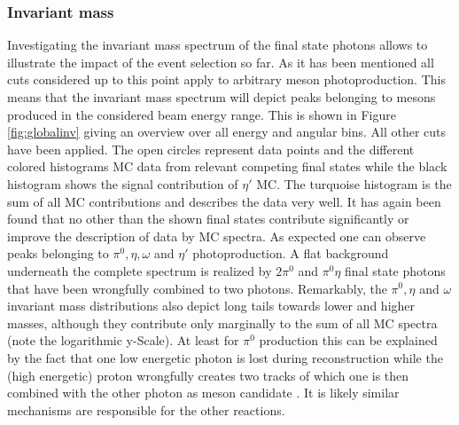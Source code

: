  \subsubsection{Invariant mass}
 Investigating the invariant mass spectrum of the final state photons allows to illustrate the impact of the event selection so far. As it has been mentioned all cuts considered up to this point apply to arbitrary meson photoproduction. This means that the invariant mass spectrum will depict peaks belonging to mesons produced in the considered beam energy range. This is shown in Figure \ref{fig:globalinv} giving an overview over all energy and angular bins. All other cuts have been applied. The open circles represent data points and the different colored histograms MC data from relevant competing final states while the black histogram shows the signal contribution of $\eta'$ MC. The turquoise histogram is the sum of all MC contributions and describes the data very well. It has again been found that no other than the shown final states contribute significantly or improve the description of data by MC spectra. As expected one can observe peaks belonging to $\pi^0,\eta, \omega$ and $\eta'$ photoproduction. A flat background underneath the complete spectrum is realized by $2\pi^0$ and $\pi^0\eta$ final state photons that have been wrongfully combined to two photons. Remarkably, the $\pi^0,\eta$ and $\omega$ invariant mass distributions also depict long tails towards lower and higher masses, although they contribute only marginally to the sum of all MC spectra (note the logarithmic y-Scale). At least for $\pi^0$ production this can be explained by the fact that one low energetic photon is lost during reconstruction while the (high energetic) proton wrongfully creates two tracks of which one is then combined with the other photon as meson candidate \cite{farahphd}. It is likely similar mechanisms are responsible for the other reactions.
